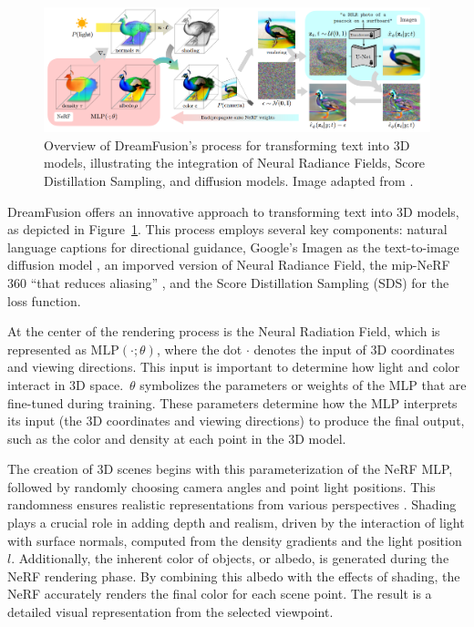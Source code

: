 \begin{figure}[ht]
  \centering
    \includegraphics[width=1\columnwidth]{figures/Dreamfusion.png}
    \caption{Overview of DreamFusion's process for transforming text into 3D models, illustrating the integration of Neural Radiance Fields, Score Distillation Sampling, and diffusion models. Image adapted from \citep{pooleDreamfusion}.}\label{fig:figureDreamfusion}
  \end{figure}

DreamFusion offers an innovative approach to transforming text into 3D models, as depicted in Figure~\ref{fig:figureDreamfusion}. This process employs several key components: natural language captions for directional guidance, Google's Imagen as the text-to-image diffusion model \citep{saharia2022imagen}, an imporved version of Neural Radiance Field, the mip-NeRF 360 \citep{barron2022mipnerf} ``that reduces aliasing'' \citep{pooleDreamfusion}, and the Score Distillation Sampling (SDS) for the loss function.

At the center of the rendering process is the Neural Radiation Field, which is represented as \( \text{MLP}(\cdot; \theta) \), where the dot \(\cdot\) denotes the input of 3D coordinates and viewing directions. This input is important to determine how light and color interact in 3D space.~\(\theta\) symbolizes the parameters or weights of the MLP that are fine-tuned during training. These parameters determine how the MLP interprets its input (the 3D coordinates and viewing directions) to produce the final output, such as the color and density at each point in the 3D model.

The creation of 3D scenes begins with this parameterization of the NeRF MLP, followed by randomly choosing camera angles and point light positions. This randomness ensures realistic representations from various perspectives \citep{pooleDreamfusion}. Shading plays a crucial role in adding depth and realism, driven by the interaction of light with surface normals, computed from the density gradients and the light position \( l \). Additionally, the inherent color of objects, or albedo, is generated during the NeRF rendering phase. By combining this albedo with the effects of shading, the NeRF accurately renders the final color for each scene point. The result is a detailed visual representation from the selected viewpoint.

